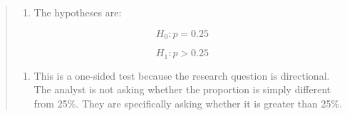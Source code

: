 \documentclass[
  letterpaper,
  DIV=11,
  numbers=noendperiod]{scrreprt}
\providecommand{\tightlist}{%
  \setlength{\itemsep}{0pt}\setlength{\parskip}{0pt}}
\begin{document}
\begin{tcolorbox}
\begin{quote}
\begin{enumerate}
\def\labelenumi{\alph{enumi}.}
\setcounter{enumi}{1}
\tightlist
\item
  The hypotheses are:
\end{enumerate}

\[
H_0: p = 0.25
\]

\[
H_1: p > 0.25
\]

\begin{enumerate}
\def\labelenumi{\alph{enumi}.}
\setcounter{enumi}{2}
\tightlist
\item
  This is a one-sided test because the research question is directional.
  The analyst is not asking whether the proportion is simply different
  from 25\%. They are specifically asking whether it is greater than
  25\%.
\end{enumerate}
\end{quote}

\end{tcolorbox}
\end{document}
